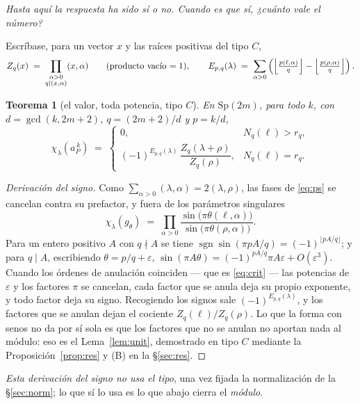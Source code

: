 \documentclass[11pt,a4paper]{article}
\newtheorem{theorem}{Teorema}[section]
\newcommand{\Sp}{\mathrm{Sp}}
\begin{document}
\noindent\emph{Hasta aquí la respuesta ha sido sí o no. Cuando es que sí, ¿cuánto vale el número?}

Escríbase, para un vector $x$ y las raíces positivas del tipo $C$,
\[
Z_q(x)\;=\;\prod_{\substack{\alpha>0\\ q\mid(x,\alpha)}}(x,\alpha)
\qquad\text{(producto vacío $=1$)},
\qquad
E_{p,q}(\lambda)\;=\;\sum_{\alpha>0}\left(
\Bigl\lfloor\tfrac{p(\ell,\alpha)}{q}\Bigr\rfloor-\Bigl\lfloor\tfrac{p(\rho,\alpha)}{q}\Bigr\rfloor
\right).
\]

\begin{theorem}[el valor, toda potencia, tipo $C$]\label{thm:signo}
En $\Sp(2m)$, para todo $k$, con $d=\gcd(k,2m+2)$, $q=(2m+2)/d$ y $p=k/d$,
\[
\boxed{\;
\chi_\lambda(a_P^{\,k})\;=\;
\begin{cases}
0, & N_q(\ell)>r_q,\\[2mm]
(-1)^{E_{p,q}(\lambda)}\,\dfrac{Z_q(\lambda+\rho)}{Z_q(\rho)}, & N_q(\ell)=r_q .
\end{cases}\;}
\]
\end{theorem}

\begin{proof}[Derivación del signo]
Como $\sum_{\alpha>0}(\lambda,\alpha)=2(\lambda,\rho)$, las fases de \eqref{eq:ps} se cancelan contra
su prefactor, y fuera de los parámetros singulares
\[
\chi_\lambda(g_\theta)\;=\;\prod_{\alpha>0}
\frac{\sin\bigl(\pi\theta(\ell,\alpha)\bigr)}{\sin\bigl(\pi\theta(\rho,\alpha)\bigr)} .
\]
Para un entero positivo $A$ con $q\nmid A$ se tiene
$\operatorname{sgn}\sin(\pi pA/q)=(-1)^{\lfloor pA/q\rfloor}$; y para $q\mid A$, escribiendo
$\theta=p/q+\varepsilon$, $\sin(\pi A\theta)=(-1)^{pA/q}\pi A\varepsilon+O(\varepsilon^3)$. Cuando
los órdenes de anulación coinciden --- que es \eqref{eq:crit} --- las potencias de $\varepsilon$ y
los factores $\pi$ se cancelan, cada factor que se anula deja su propio exponente, y todo factor deja
su signo. Recogiendo los signos sale $(-1)^{E_{p,q}(\lambda)}$, y los factores que se anulan dejan el
cociente $Z_q(\ell)/Z_q(\rho)$. Lo que la forma con senos no da por sí sola es que los factores que
no se anulan no aportan nada al módulo: eso es el Lema~\ref{lem:unit}, demostrado en tipo $C$
mediante la Proposición~\ref{prop:res} y (B) en la \S\ref{sec:res}.
\end{proof}

\noindent \emph{Esta derivación del signo no usa el tipo}, una vez fijada la normalización de la
\S\ref{sec:norm}; lo que sí lo usa es lo que abajo cierra el \emph{módulo}.
\end{document}
